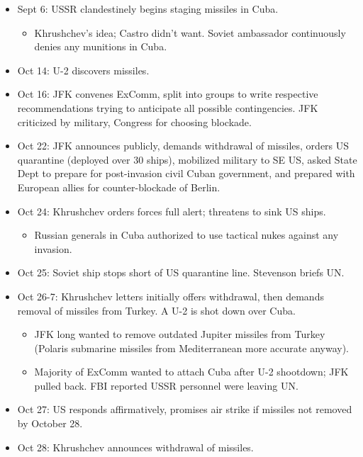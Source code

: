 \documentclass[
]{article}
\providecommand{\tightlist}{%
  \setlength{\itemsep}{0pt}\setlength{\parskip}{0pt}}
\begin{document}
\begin{itemize}
\item
  Sept 6: USSR clandestinely begins staging missiles in Cuba.

  \begin{itemize}
  \tightlist
  \item
    Khrushchev's idea; Castro didn't want. Soviet ambassador
    continuously denies any munitions in Cuba.
  \end{itemize}
\item
  Oct 14: U-2 discovers missiles.
\item
  Oct 16: JFK convenes ExComm, split into groups to write respective
  recommendations trying to anticipate all possible contingencies. JFK
  criticized by military, Congress for choosing blockade.
\item
  Oct 22: JFK announces publicly, demands withdrawal of missiles, orders
  US quarantine (deployed over 30 ships), mobilized military to SE US,
  asked State Dept to prepare for post-invasion civil Cuban government,
  and prepared with European allies for counter-blockade of Berlin.
\item
  Oct 24: Khrushchev orders forces full alert; threatens to sink US
  ships.

  \begin{itemize}
  \tightlist
  \item
    Russian generals in Cuba authorized to use tactical nukes against
    any invasion.
  \end{itemize}
\item
  Oct 25: Soviet ship stops short of US quarantine line. Stevenson
  briefs UN.
\item
  Oct 26-7: Khrushchev letters initially offers withdrawal, then demands
  removal of missiles from Turkey. A U-2 is shot down over Cuba.

  \begin{itemize}
  \item
    JFK long wanted to remove outdated Jupiter missiles from Turkey
    (Polaris submarine missiles from Mediterranean more accurate
    anyway).
  \item
    Majority of ExComm wanted to attach Cuba after U-2 shootdown; JFK
    pulled back. FBI reported USSR personnel were leaving UN.
  \end{itemize}
\item
  Oct 27: US responds affirmatively, promises air strike if missiles not
  removed by October 28.
\item
  Oct 28: Khrushchev announces withdrawal of missiles.
\end{itemize}
\end{document}
